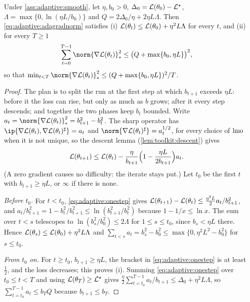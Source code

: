 \begin{refsection}
\begin{theorem}\label{thm:adaptive:adagradnorm}
Under \cref{ass:adaptive:smooth}, let $\eta,b_0>0$, $\Delta_0=\mathcal{L}(\theta_0)-\mathcal{L}^\star$, $\Lambda=\max\{0,\ln(\eta L/b_0)\}$ and $Q=2\Delta_0/\eta+2\eta L\Lambda$. Then \eqref{eq:adaptive:adagradnorm} satisfies (i) $\mathcal{L}(\theta_t)\le\mathcal{L}(\theta_0)+\eta^2L\Lambda$ for every $t$, and (ii) for every $T\ge1$
\[
  \sum_{t=0}^{T-1}\norm{\nabla\Loss(\theta_t)}_*^2\le\bigl(Q+\max\{b_0,\eta L\}\bigr)^2,
\]
so that $\min_{t<T}\norm{\nabla\Loss(\theta_t)}_*^2\le(Q+\max\{b_0,\eta L\})^2/T$.
\end{theorem}

\begin{proof}
The plan is to split the run at the first step at which $b_{t+1}$ exceeds $\eta L$: before it the loss can rise, but only as much as $b$ grows; after it every step descends; and together the two phases keep $b_t$ bounded. Write $a_t=\norm{\nabla\Loss(\theta_t)}_*^2=b_{t+1}^2-b_t^2$. The sharp operator has $\ip{\nabla\Loss(\theta_t),\nabla\Loss(\theta_t)^\sharp}=a_t$ and $\norm{\nabla\Loss(\theta_t)^\sharp}=a_t^{1/2}$, for every choice of $\operatorname{lmo}$ when it is not unique, so the descent lemma (\cref{lem:toolkit:descent}) gives
\begin{equation}\label{eq:adaptive:onestep}
  \mathcal{L}(\theta_{t+1})\le\mathcal{L}(\theta_t)-\frac{\eta}{b_{t+1}}\Bigl(1-\frac{\eta L}{2b_{t+1}}\Bigr)a_t .
\end{equation}
(A zero gradient causes no difficulty: the iterate stays put.) Let $t_0$ be the first $t$ with $b_{t+1}\ge\eta L$, or $\infty$ if there is none.

\emph{Before $t_0$.} For $t<t_0$, \eqref{eq:adaptive:onestep} gives $\mathcal{L}(\theta_{t+1})-\mathcal{L}(\theta_t)\le\frac{\eta^2L}2a_t/b_{t+1}^2$, and $a_t/b_{t+1}^2=1-b_t^2/b_{t+1}^2\le\ln(b_{t+1}^2/b_t^2)$ because $1-1/x\le\ln x$. The sum over $t<s$ telescopes to $\ln(b_s^2/b_0^2)\le2\Lambda$ for $1\le s\le t_0$, since $b_s<\eta L$ there. Hence $\mathcal{L}(\theta_s)\le\mathcal{L}(\theta_0)+\eta^2L\Lambda$ and $\sum_{t<s}a_t=b_s^2-b_0^2\le\max\{0,\eta^2L^2-b_0^2\}$ for $s\le t_0$.

\emph{From $t_0$ on.} For $t\ge t_0$, $b_{t+1}\ge\eta L$, the bracket in \eqref{eq:adaptive:onestep} is at least $\frac12$, and the loss decreases; this proves (i). Summing \eqref{eq:adaptive:onestep} over $t_0\le t<T$ and using $\mathcal{L}(\theta_T)\ge\mathcal{L}^\star$ gives $\frac\eta2\sum_{t=t_0}^{T-1}a_t/b_{t+1}\le\Delta_0+\eta^2L\Lambda$, so $\sum_{t=t_0}^{T-1}a_t\le b_TQ$ because $b_{t+1}\le b_T$.


\end{proof}
\end{refsection}
